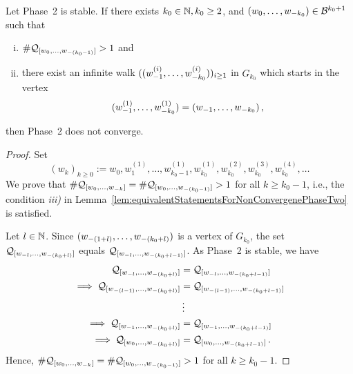 \begin{thm}
Let Phase~2 is stable.  If there exists $k_0\in\NN, k_0\geq 2$, and $\tupleo{k_0}\in\B^{k_0+1}$ such that
\begin{enumerate}[i)]
	\item $\#\Qwo{(k_0-1)}>1$ and
	\item there exist an infinite walk $(\tuple[w^{(i)}]{1}{k_0})_{i\geq 1}$ in $G_{k_0}$ which starts in the vertex  $$\tuple[w^{(1)}]{1}{k_0}=\tuple{1}{k_0}\,,$$ 
\end{enumerate}
then Phase~2 does not converge.
\end{thm}
\begin{proof}
Set
$$(w_k)_{k\geq 0}:=w_0, w_1^{(1)}, \dots , w^{(1)}_{k_0-1}, w^{(1)}_{k_0}, w_{k_0}^{(2)},w_{k_0}^{(3)},w_{k_0}^{(4)},\dots$$
We prove that $\#\Qwo{k}=\#\Qwo{(k_0-1)}>1$ for all $k\geq k_0-1$, i.e., the condition \textit{iii)} in Lemma~\ref{lem:equivalentStatementsForNonConvergenePhaseTwo} is satisfied.


Let $l\in\NN$. Since $\tuple{(1+l)}{(k_0+l)}$ is a vertex of $G_{k_0}$, the set $\Qw{l}{(k_0+l)}$ equals $\Qw{l}{(k_0+l-1)}$. As Phase~2 is stable, we have
\begin{align*}
\Qw{l}{(k_0+l)}&=\Qw{l}{(k_0+l-1)}\\
\implies \Qw{(l-1)}{(k_0+l)}&=\Qw{(l-1)}{(k_0+l-1)}\\
&\vdots \\
\implies \Qw{1}{(k_0+l)}&=\Qw{1}{(k_0+l-1)}\\
\implies \Qwo{(k_0+l)}&=\Qwo{(k_0+l-1)}\,.
\end{align*}
Hence, $\#\Qwo{k}=\#\Qwo{(k_0-1)}>1$ for all $k\geq k_0-1$.
\end{proof}













